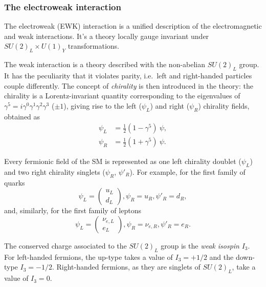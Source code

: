 \documentclass[../main.tex]{subfiles}
\begin{document}
\subsubsection{The electroweak interaction}

The electroweak (EWK) interaction is a unified description of the electromagnetic and weak interactions. It's a theory locally gauge invariant under $SU(2)_L \times U(1)_Y$ transformations.

The weak interaction is a theory described with the non-abelian $SU(2)_L$ group. It has the peculiarity that it violates parity, i.e.~left and right-handed particles couple differently. The concept of \textit{chirality} is then introduced in the theory: the chirality is a Lorentz-invariant quantity corresponding to the eigenvalues of $\gamma^5=i\gamma^0\gamma^1\gamma^2\gamma^3$ ($\pm1$), giving rise to the left ($\psi_L$) and right ($\psi_R$) chirality fields, obtained as
\begin{align}
\label{theo:eq:chiral_1}
\psi_L &= \frac{1}{2}(1 - \gamma^5)~\psi, \\
\label{theo:eq:chiral_2}
\psi_R &= \frac{1}{2}(1 + \gamma^5)~\psi.
\end{align}

Every fermionic field of the SM is represented as one left chirality doublet ($\psi_L$) and two right chirality singlets ($\psi_R$, $\psi'_R$). For example, for the first family of quarks
\begin{equation}
\psi_L = \left(
\begin{matrix}
u_L \\
d_L
\end{matrix}
\right), \psi_R = u_R, \psi'_R = d_R,
\end{equation}
and, similarly, for the first family of leptons
\begin{equation}
\label{theo:eq:ele_chiral}
\psi_L = \left(
\begin{matrix}
\nu_{e, L} \\
e_L
\end{matrix}
\right), \psi_R = \nu_{e,R}, \psi'_R = e_R.
\end{equation}

The conserved charge associated to the $SU(2)_L$ group is the \textit{weak isospin} $I_3$. For left-handed fermions, the up-type takes a value of $I_3=+1/2$ and the down-type $I_3=-1/2$. Right-handed fermions, as they are singlets of $SU(2)_L$, take a value of $I_3=0$.
\end{document}
